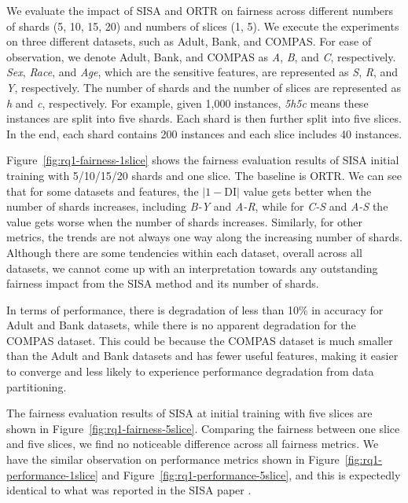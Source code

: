 We evaluate the impact of SISA and ORTR on fairness across different numbers of shards (5, 10, 15, 20) and numbers of slices (1, 5). We execute the experiments on three different datasets, such as Adult, Bank, and COMPAS. For ease of observation, we denote Adult, Bank, and COMPAS as \textit{A}, \textit{B}, and \textit{C}, respectively. \textit{Sex}, \textit{Race}, and \textit{Age}, which are the sensitive features, are represented as \textit{S}, \textit{R}, and \textit{Y}, respectively.
The number of shards and the number of slices are represented as \textit{h} and \textit{c}, respectively. 
For example, given 1,000 instances, \textit{5h5c} means these instances are split into five shards. Each shard is then further split into five slices. In the end, each shard contains 200 instances and each slice includes 40 instances.


Figure~\ref{fig:rq1-fairness-1slice} shows the fairness evaluation results of SISA initial training with 5/10/15/20 shards and one slice. The baseline is ORTR. We can see that for some datasets and features, the $|1-\textrm{DI}|$ value gets better when the number of shards increases, including \textit{B-Y} and \textit{A-R}, while for \textit{C-S} and \textit{A-S} the value gets worse when the number of shards increases. Similarly, for other metrics, the trends are not always one way along the increasing number of shards. Although there are some tendencies within each dataset, overall across all datasets, we cannot come up with an interpretation towards any outstanding fairness impact from the SISA method and its number of shards.



In terms of performance, there is degradation of less than 10\% in accuracy for Adult and Bank datasets, while there is no apparent degradation for the COMPAS dataset. This could be because the COMPAS dataset is much smaller than the Adult and Bank datasets and has fewer useful features, making it easier to converge and less likely to experience performance degradation from data partitioning.



The fairness evaluation results of SISA at initial training with five slices are shown in Figure~\ref{fig:rq1-fairness-5slice}. Comparing the fairness between one slice and five slices, we find no noticeable difference across all fairness metrics. We have the similar observation on performance metrics shown in Figure~\ref{fig:rq1-performance-1slice} and Figure~\ref{fig:rq1-performance-5slice}, and this is expectedly identical to what was reported in the SISA paper \cite{sisa}.

